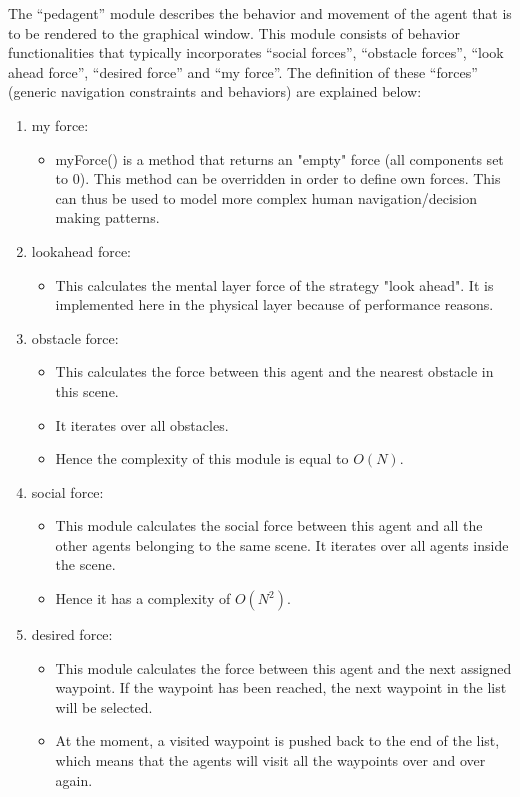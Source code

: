 The “ped\textunderscore agent” module describes the behavior and movement of the agent that is to be rendered to the graphical window. This module consists of behavior functionalities that typically incorporates “social forces”, “obstacle forces”, “look ahead force”, “desired force” and “my force”. The definition of these “forces” (generic navigation constraints and behaviors) are explained below:

\begin{enumerate}
   \item my force:
   \begin{itemize}
     \item myForce() is a method that returns an "empty" force (all components set to 0). This method can be overridden in order to define own forces. This can thus be used to model more complex human navigation/decision making patterns.
   \end{itemize}
   \item lookahead force:
   \begin{itemize}
     \item This calculates the mental layer force of the strategy "look ahead". It is implemented here in the physical layer because of performance reasons.
   \end{itemize}
   \item obstacle force:
   \begin{itemize}
     \item This calculates the force between this agent and the nearest obstacle in this scene.
     \item It iterates over all obstacles.
     \item Hence the complexity of this module is equal to $O(N)$.
   \end{itemize}
   \item social force:
   \begin{itemize}
     \item This module calculates the social force between this agent and all the other agents belonging to the same scene.  It iterates over all agents inside the scene.
     \item Hence it has a complexity of $O(N^2)$.
   \end{itemize}
   \item desired force:
   \begin{itemize}
     \item This module calculates the force between this agent and the next assigned waypoint.  If the waypoint has been reached, the next waypoint in the list will be selected.
     \item At the moment, a visited waypoint is pushed back to the end of the list, which means that the agents will visit all the waypoints over and over again.
   \end{itemize}
\end{enumerate}


